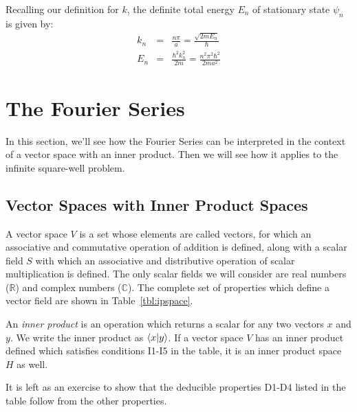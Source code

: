 \documentclass[12pt]{book}
\begin{document}
Recalling our definition for $k$, the definite total energy $E_n$ of stationary state $\psi_n$ is given by:
\begin{eqnarray}
k_n &=& \frac{n\pi}{a} = \frac{\sqrt{2mE_n}}{\hbar}\\[10pt]
E_n &=& \frac{\hbar^2k_n^2}{2m}= \frac{n^2 \pi^2 \hbar^2}{2ma^2}
\end{eqnarray}

\section{The Fourier Series}

In this section, we'll see how the Fourier Series can be interpreted in the context of a vector space with an inner product.  Then we will see how it applies to the infinite square-well problem.

\subsection{Vector Spaces with Inner Product Spaces}

A vector space $V$ is a set whose elements are called vectors, for which an associative and commutative operation of addition is defined, along with a scalar field $S$ with which an associative and distributive operation of scalar multiplication is defined.  The only scalar fields we will consider are real numbers ($\mathbb{R}$) and complex numbers ($\mathbb{C}$).  The complete set of properties which define a vector field are shown in Table~\ref{tbl:ipspace}.  

An {\em inner product} is an operation which returns a scalar for any two vectors $x$ and $y$.
We write the inner product as $\braket{x|y}$.  If a vector space $V$ has an inner product defined 
which satisfies conditions I1-I5 in the table, it is an inner product space $H$ as well.  

It is left as an exercise to show that the deducible properties D1-D4 listed in the table follow from the other properties.
\end{document}
